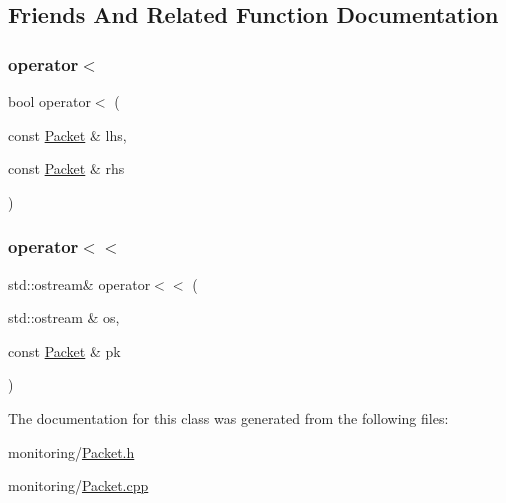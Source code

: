 \subsection{Friends And Related Function Documentation}
\mbox{\label{class_packet_af6dc4841b04ebf1cbc7af6131b50a16d}} 
\subsubsection{\texorpdfstring{operator$<$}{operator<}}
{\footnotesize\ttfamily bool operator$<$ (\begin{DoxyParamCaption}\item[{const \hyperlink{class_packet}{Packet} \&}]{lhs,  }\item[{const \hyperlink{class_packet}{Packet} \&}]{rhs }\end{DoxyParamCaption})\hspace{0.3cm}{\ttfamily [friend]}}

\mbox{\label{class_packet_a1dc8c16669bac2880a3e5a02d3a06e89}} 
\subsubsection{\texorpdfstring{operator$<$$<$}{operator<<}}
{\footnotesize\ttfamily std\+::ostream\& operator$<$$<$ (\begin{DoxyParamCaption}\item[{std\+::ostream \&}]{os,  }\item[{const \hyperlink{class_packet}{Packet} \&}]{pk }\end{DoxyParamCaption})\hspace{0.3cm}{\ttfamily [friend]}}



The documentation for this class was generated from the following files\+:\begin{DoxyCompactItemize}
\item 
monitoring/\hyperlink{_packet_8h}{Packet.\+h}\item 
monitoring/\hyperlink{_packet_8cpp}{Packet.\+cpp}\end{DoxyCompactItemize}

